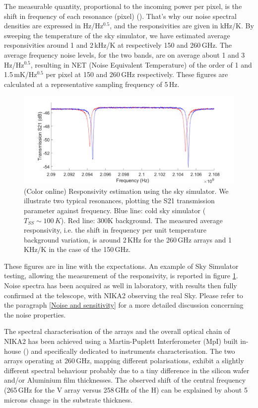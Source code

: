 \documentclass[]{aa} %
\begin{document}
The measurable quantity, proportional to the incoming power per pixel, is the shift in frequency of each resonance (pixel) (\cite{Swenson2010}). That's why our noise spectral densities are expressed in Hz/Hz$^{0.5}$, and the responsivities are given in kHz/K. By sweeping the temperature of the sky simulator, we have estimated average responsivities around 1 and 2\,kHz/K at respectively 150 and 260\,GHz. The average frequency noise levels, for the two bands, are on average about 1 and 3\,Hz/Hz$^{0.5}$, resulting in NET (Noise Equivalent Temperature) of the order of 1 and 1.5\,mK/Hz$^{0.5}$ per pixel at 150 and 260\,GHz respectively. These figures are calculated at a representative sampling frequency of 5\,Hz. 

\begin{figure}[h]
\begin{center}
   \centering
    \includegraphics[width=1.05\linewidth]{Shift_f_260GHz.png}
    \caption{(Color online) Responsivity estimation using the sky simulator. We illustrate two typical resonances, plotting the S21 transmission parameter against frequency. Blue line: cold sky simulator ($T_{SS} \sim 100\,K$). Red line: 300K background. The measured average responsivity, i.e. the shift in frequency per unit temperature background variation, is around 2\,KHz for the 260\,GHz arrays and 1\,KHz/K in the case of the 150\,GHz.}
         \label{Shift_f}
\end{center}
\end{figure}

These figures are in line with the expectations. An example of Sky Simulator testing, allowing the measurement of the responsivity, is reported in figure \ref{Shift_f}. Noise spectra has been acquired as well in laboratory, with results then fully confirmed at the telescope, with NIKA2 observing the real Sky. Please refer to the paragraph \ref{Noise and sensitivity} for a more detailed discussion concerning the noise properties. 


The spectral characterisation of the arrays and the overall optical chain of NIKA2 has been achieved using a Martin-Puplett Interferometer (MpI) built in-house (\cite{Durand2008}) and specifically dedicated to instruments characterisation. The two arrays operating at 260\,GHz, mapping different polarisations, exhibit a slightly different spectral behaviour probably due to a tiny difference in the silicon wafer and/or Aluminium film thicknesses. The observed shift of the central frequency (265\,GHz for the V array versus 258\,GHz of the H) can be explained by about 5\,microns change in the substrate thickness.
\end{document}
